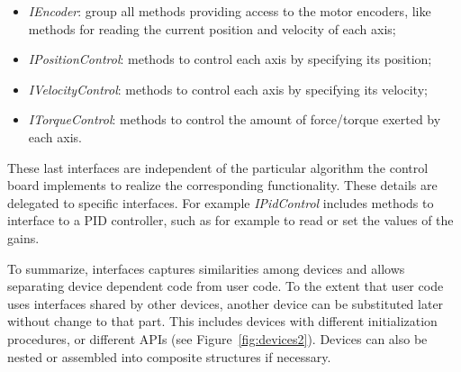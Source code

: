 \begin{itemize}

\item \emph{IEncoder}: group all methods providing access to the motor 
encoders, like methods for reading the current position and velocity of 
each axis;

\item \emph{IPositionControl}: methods to control each axis 
by specifying its position;

\item \emph{IVelocityControl}: methods to control each axis 
by specifying its velocity;

\item \emph{ITorqueControl}: methods to control the amount of 
force/torque exerted by each axis.

\end{itemize}

These last interfaces are independent of the particular algorithm the 
control board implements to realize the corresponding functionality. 
These details are delegated to specific interfaces. For example 
\emph{IPidControl} includes methods to interface to a PID controller, 
such as for example to read or set the values of the gains.

To summarize, interfaces captures similarities among devices and 
allows separating device dependent code from user code. To the 
extent that user code uses interfaces shared by other devices, 
another device can be substituted later without change to that part. This 
includes devices with different initialization procedures, or different
APIs (see Figure~\ref{fig:devices2}).  Devices can
also be nested or assembled into composite structures if necessary.

